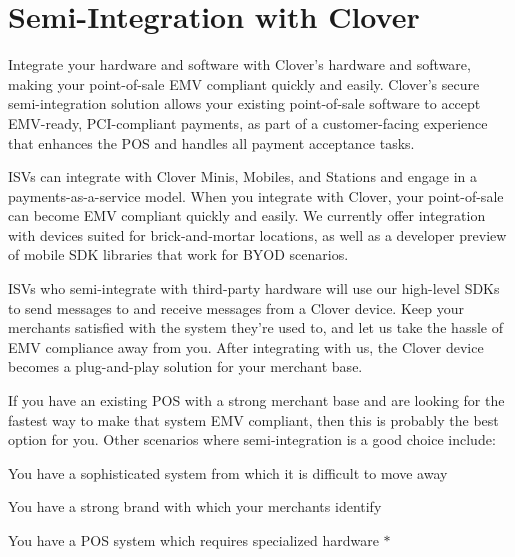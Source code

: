 \hypertarget{index_intro_sec}{}\section{Semi-\/\+Integration with Clover}\label{index_intro_sec}
Integrate your hardware and software with Clover’s hardware and software, making your point-\/of-\/sale E\+MV compliant quickly and easily. Clover’s secure semi-\/integration solution allows your existing point-\/of-\/sale software to accept E\+M\+V-\/ready, P\+C\+I-\/compliant payments, as part of a customer-\/facing experience that enhances the P\+OS and handles all payment acceptance tasks.

I\+S\+Vs can integrate with Clover Minis, Mobiles, and Stations and engage in a payments-\/as-\/a-\/service model. When you integrate with Clover, your point-\/of-\/sale can become E\+MV compliant quickly and easily. We currently offer integration with devices suited for brick-\/and-\/mortar locations, as well as a developer preview of mobile S\+DK libraries that work for B\+Y\+OD scenarios.

I\+S\+Vs who semi-\/integrate with third-\/party hardware will use our high-\/level S\+D\+Ks to send messages to and receive messages from a Clover device. Keep your merchants satisfied with the system they’re used to, and let us take the hassle of E\+MV compliance away from you. After integrating with us, the Clover device becomes a plug-\/and-\/play solution for your merchant base.

If you have an existing P\+OS with a strong merchant base and are looking for the fastest way to make that system E\+MV compliant, then this is probably the best option for you. Other scenarios where semi-\/integration is a good choice include\+:

\begin{DoxyItemize}
\item {\ttfamily You} have a sophisticated system from which it is difficult to move away \item {\ttfamily You} have a strong brand with which your merchants identify \item {\ttfamily You} have a P\+OS system which requires specialized hardware $\ast$ \end{DoxyItemize}
